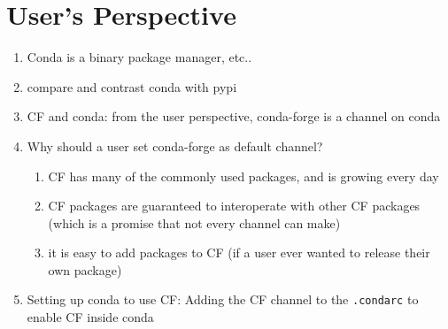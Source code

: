 \documentclass[fleqn,10pt,lineno]{wlpeerj} %
\newcounter{saveenumi}
\newcommand{\seti}{\setcounter{saveenumi}{\value{enumi}}}
\newcommand{\conti}{\setcounter{enumi}{\value{saveenumi}}}
\begin{document}
\section*{User's Perspective}
\begin{enumerate}\conti
\item Conda is a binary package manager, etc..
\item compare and contrast conda with pypi
\item CF and conda:  from the user perspective, conda-forge is a channel on conda
\item Why should a user set conda-forge as default channel?
\begin{enumerate}
\item CF has many of the commonly used packages, and is growing every day
\item CF packages are guaranteed to interoperate with other CF packages
(which is a promise that not every channel can make)
\item it is easy to add packages to CF (if a user ever wanted to release their
own package)
\end{enumerate}
\item Setting up conda to use CF: Adding the CF channel to the \texttt{.condarc} to enable CF
inside conda
\end{enumerate}\seti
\end{document}
